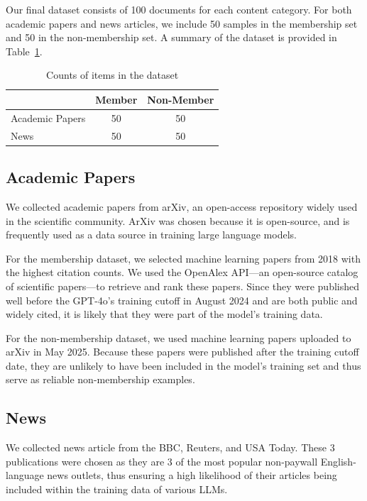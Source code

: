 \documentclass[sigconf]{acmart}
\begin{document}
Our final dataset consists of 100 documents for each content category. For both academic papers and news articles, we include 50 samples in the membership set and 50 in the non-membership set. A summary of the dataset is provided in Table~\ref{tab:dataset}.


\begin{table}[ht]
  \centering
  \begin{tabular}{lcc}
    \hline
    & Member & Non-Member \\
    \hline
    Academic Papers & 50 & 50 \\
    News            & 50 & 50 \\
    \hline
  \end{tabular}
  \caption{Counts of items in the dataset}
  \label{tab:dataset}
\end{table}


\subsection{Academic Papers}

We collected academic papers from arXiv, an open-access repository widely used in the scientific community. ArXiv was chosen because it is open-source, and is frequently used as a data source in training large language models.

For the membership dataset, we selected machine learning papers from 2018 with the highest citation counts. We used the OpenAlex API—an open-source catalog of scientific papers—to retrieve and rank these papers. Since they were published well before the GPT-4o's training cutoff in August 2024 and are both public and widely cited, it is likely that they were part of the model’s training data.

For the non-membership dataset, we used machine learning papers uploaded to arXiv in May 2025. Because these papers were published after the training cutoff date, they are unlikely to have been included in the model’s training set and thus serve as reliable non-membership examples.

\subsection{News}

We collected news article from the BBC, Reuters, and USA Today. These 3 publications were chosen as they are 3 of the most popular non-paywall English-language news outlets, thus ensuring a high likelihood of their articles being included within the training data of various LLMs.
\end{document}
